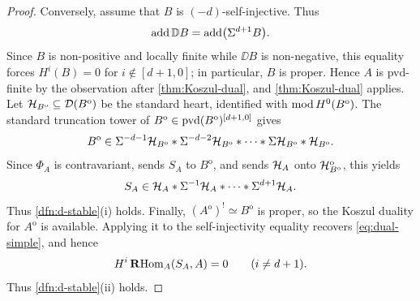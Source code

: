 \documentclass[11pt,a4paper,dvipsnames,x11names]{amsart}
\begin{document}
\begin{proof}
Conversely, assume that $B$ is $(-d)$-self-injective. Thus
\[
\operatorname{add}\mathbb D B=\operatorname{add}\bigl(\Sigma^{d+1}B\bigr).
\]
Since $B$ is non-positive and locally finite while $\DD B$ is non-negative, this equality forces $H^i(B)=0$ for $i\notin[d+1,0]$; in particular, $B$ is proper. Hence $A$ is pvd-finite by the observation after \cref{thm:Koszul-dual}, and \cref{thm:Koszul-dual} applies. Let $\mathcal H_{B^{\mathrm{o}}}\subseteq\mathcal D(B^{\mathrm{o}})$ be the standard heart, identified with $\operatorname{mod} H^0(B^{\mathrm{o}})$. The standard truncation tower of $B^{\mathrm{o}}\in\operatorname{pvd}(B^{\mathrm{o}})^{[d+1,0]}$ gives
\[
B^{\mathrm{o}}\in
\Sigma^{-d-1}\mathcal H_{B^{\mathrm{o}}}*\Sigma^{-d-2}\mathcal H_{B^{\mathrm{o}}}*\cdots*\Sigma\mathcal H_{B^{\mathrm{o}}}*\mathcal H_{B^{\mathrm{o}}}.
\]
Since $\Phi_A$ is contravariant, sends $S_A$ to $B^{\mathrm{o}}$, and sends $\mathcal H_A$ onto $\mathcal H_{B^{\mathrm{o}}}^{\mathrm{o}}$, this yields
\[
S_A\in\mathcal H_A*\Sigma^{-1}\mathcal H_A*\cdots*\Sigma^{d+1}\mathcal H_A.
\]
Thus \cref{dfn:d-stable}(i) holds. Finally, $(A^{\mathrm{o}})^!\simeq B^{\mathrm{o}}$ is proper, so the Koszul duality for $A^{\mathrm{o}}$ is available. Applying it to the self-injectivity equality recovers \eqref{eq:dual-simple}, and hence
\[
H^i\operatorname{\mathbf{R}Hom}_A(S_A,A)=0\qquad(i\neq d+1).
\]
Thus \cref{dfn:d-stable}(ii) holds.
\end{proof}
\end{document}
